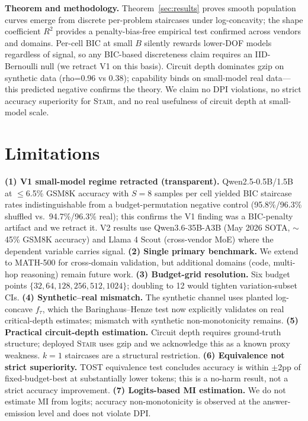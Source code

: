\documentclass{article}
\newcommand{\method}{\textsc{Stair}}
\begin{document}
\textbf{Theorem and methodology.}  Theorem~\ref{sec:results} proves smooth population curves emerge from discrete per-problem staircases under log-concavity; the shape coefficient $R^2$ provides a penalty-bias-free empirical test confirmed across vendors and domains.  Per-cell BIC at small $B$ silently rewards lower-DOF models regardless of signal, so any BIC-based discreteness claim requires an IID-Bernoulli null (we retract V1 on this basis).  Circuit depth dominates gzip on synthetic data (rho=0.96 vs 0.38); capability binds on small-model real data---this predicted negative confirms the theory.  We claim no DPI violations, no strict accuracy superiority for \method{}, and no real usefulness of circuit depth at small-model scale.
\section{Limitations}
\label{sec:limitations}

\textbf{(1) V1 small-model regime retracted (transparent).}  Qwen2.5-0.5B/1.5B at $\leq$6.5\% GSM8K accuracy with $S{=}8$ samples per cell yielded BIC staircase rates indistinguishable from a budget-permutation negative control (95.8\%/96.3\% shuffled vs.\ 94.7\%/96.3\% real); this confirms the V1 finding was a BIC-penalty artifact and we retract it.  V2 results use Qwen3.6-35B-A3B (May 2026 SOTA, $\sim$45\% GSM8K accuracy) and Llama 4 Scout (cross-vendor MoE) where the dependent variable carries signal.  \textbf{(2) Single primary benchmark.}  We extend to MATH-500 for cross-domain validation, but additional domains (code, multi-hop reasoning) remain future work.  \textbf{(3) Budget-grid resolution.}  Six budget points $\{32, 64, 128, 256, 512, 1024\}$; doubling to 12 would tighten variation-subset CIs.  \textbf{(4) Synthetic--real mismatch.}  The synthetic channel uses planted log-concave $f_\tau$, which the Baringhaus--Henze test now explicitly validates on real critical-depth estimates; mismatch with synthetic non-monotonicity remains.  \textbf{(5) Practical circuit-depth estimation.}  Circuit depth requires ground-truth structure; deployed \method{} uses gzip and we acknowledge this as a known proxy weakness.  $k{=}1$ staircases are a structural restriction.  \textbf{(6) Equivalence not strict superiority.}  TOST equivalence test concludes accuracy is within $\pm$2pp of fixed-budget-best at substantially lower tokens; this is a no-harm result, not a strict accuracy improvement.  \textbf{(7) Logits-based MI estimation.}  We do not estimate MI from logits; accuracy non-monotonicity is observed at the answer-emission level and does not violate DPI.
\end{document}
